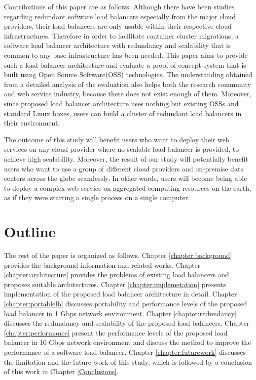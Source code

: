 Contributions of this paper are as follows:
Although there have been studies regarding redundant software load balancers especially from the major cloud providers\cite{eisenbud2016maglev,patel2013ananta}, their load balancers are only usable within their respective cloud infrastructures.
Therefore in order to facilitate container cluster migrations, a software load balancer architecture with redundancy and scalability that is common to any base infrastructure has been needed.
This paper aims to provide such a load balancer architecture and evaluate a proof-of-concept system that is built using Open Source Software(OSS) technologies.
The understanding obtained from a detailed analysis of the evaluation also helps both the research community and web service industry, because there does not exist enough of them.
Moreover, since proposed load balancer architecture uses nothing but existing OSSs and standard Linux boxes, users can build a cluster of redundant load balancers in their environment.

The outcome of this study will benefit users who want to deploy their web services on any cloud provider where no scalable load balancer is provided, to achieve high scalability.
Moreover, the result of our study will potentially benefit users who want to use a group of different cloud providers and on-premise data centers across the globe seamlessly.
In other words, users will become being able to deploy a complex web service on aggregated computing resources on the earth, as if they were starting a single process on a single computer.

\section{Outline}

The rest of the paper is organized as follows.
Chapter \ref{chapter:background} provides the background information and related works.
Chapter \ref{chapter:architecture} provides the problems of existing load balancers and proposes suitable architectures.
Chapter \ref{chapter:implemetation} presents implementation of the proposed load balancer architecture in detail.
Chapter \ref{chapter:portablelb} discusses portability and performance levels of the proposed load balancer in 1 Gbps network environment.
Chapter \ref{chapter:redundancy} discusses the redundancy and scalability of the proposed load balancers.
Chapter \ref{chapter:performance} present the performance levels of the proposed load balancer in 10 Gbps network environment and discuss the method to improve the performance of a software load balancer.
Chapter \ref{chapter:futurework} discusses the limitation and the future work of this study,
which is followed by a conclusion of this work in Chapter \ref{Conclusions}.





